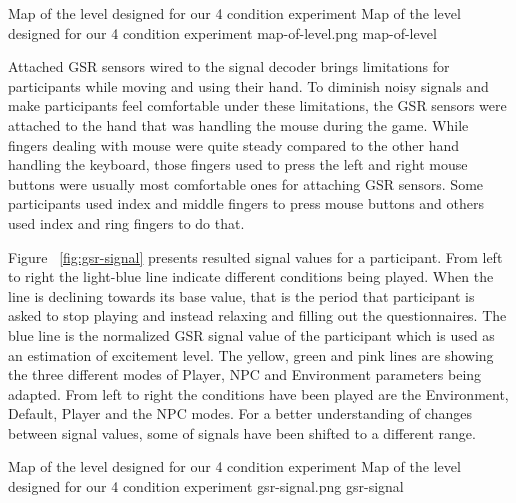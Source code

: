 \documentclass[conference]{IEEEtran}
\begin{document}
\img
{Map of the level designed for our 4 condition experiment}
{Map of the level designed for our 4 condition experiment}
{map-of-level.png}
{map-of-level}

Attached GSR sensors wired to the signal decoder brings limitations for participants while moving and using their hand. To diminish noisy signals and make participants feel comfortable under these limitations, the GSR sensors were attached to the hand that was handling the mouse during the game. While fingers dealing with mouse were quite steady compared to the other hand handling the keyboard, those fingers used to press the left and right mouse buttons were usually most comfortable ones for attaching GSR sensors. Some participants used index and middle fingers to press mouse buttons and others used index and ring fingers to do that.

Figure ~\ref{fig:gsr-signal} presents resulted signal values for a participant. From left to right the light-blue line indicate different conditions being played. When the line is declining towards its base value, that is the period that participant is asked to stop playing and instead relaxing and filling out the questionnaires. The blue line is the normalized GSR signal value of the participant which is used as an estimation of excitement level. The yellow, green and pink lines are showing the three different modes of Player, NPC and Environment parameters being adapted. From left to right the conditions have been played are the Environment, Default, Player and the NPC modes. For a better understanding of changes between signal values, some of signals have been shifted to a different range.

\dcimg
{Map of the level designed for our 4 condition experiment}
{Map of the level designed for our 4 condition experiment}
{gsr-signal.png}
{gsr-signal}
\end{document}
